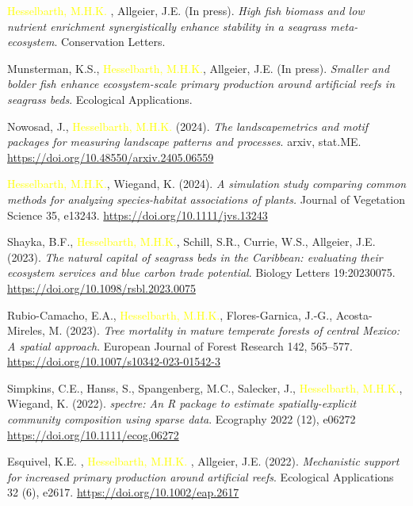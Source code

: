 \documentclass[hidelinks]{report}
\begin{document}
\begin{hangparas}{7.5mm}{1}
	
\textcolor{yellow}{Hesselbarth, M.H.K.} \textcolor{green}{\Cross}, Allgeier, J.E. \textcolor{green}{\Cross} (In press). \textit{High fish biomass and low nutrient enrichment synergistically enhance stability in a seagrass meta-ecosystem}. Conservation Letters.	

Munsterman, K.S., \textcolor{yellow}{Hesselbarth, M.H.K.}, Allgeier, J.E. (In press). \textit{Smaller and bolder fish enhance ecosystem-scale primary production around artificial reefs in seagrass beds}. Ecological Applications. %
		
Nowosad, J., \textcolor{yellow}{Hesselbarth, M.H.K.} (2024). \textit{The landscapemetrics and motif packages for measuring landscape patterns and processes}. arxiv, stat.ME. \url{https://doi.org/10.48550/arxiv.2405.06559}

\textcolor{yellow}{Hesselbarth, M.H.K.}, Wiegand, K. (2024). \textit{A simulation study comparing common methods for analyzing species-habitat associations of plants.} Journal of Vegetation Science 35, e13243. \url{https://doi.org/10.1111/jvs.13243}
	
Shayka, B.F., \textcolor{yellow}{Hesselbarth, M.H.K.}, Schill, S.R., Currie, W.S., Allgeier, J.E. (2023). \textit{The natural capital of seagrass beds in the Caribbean: evaluating their ecosystem services and blue carbon trade potential}. Biology Letters 19:20230075. \url{https://doi.org/10.1098/rsbl.2023.0075}
	
Rubio-Camacho, E.A., \textcolor{yellow}{Hesselbarth, M.H.K.}, Flores-Garnica, J.-G., Acosta-Mireles, M. (2023). \textit{Tree mortality in mature temperate forests of central Mexico: A spatial approach}. European Journal of Forest Research 142, 565–577. \url{https://doi.org/10.1007/s10342-023-01542-3}

Simpkins, C.E., Hanss, S., Spangenberg, M.C., Salecker, J., \textcolor{yellow}{Hesselbarth, M.H.K.}, Wiegand, K. (2022). \textit{spectre: An R package to estimate spatially-explicit community composition using sparse data}. Ecography 2022 (12), e06272 \url{https://doi.org/10.1111/ecog.06272}

Esquivel, K.E. \textcolor{green}{\Cross}, \textcolor{yellow}{Hesselbarth, M.H.K.} \textcolor{green}{\Cross}, Allgeier, J.E. (2022). \textit{Mechanistic support for increased primary production around artificial reefs}. Ecological Applications 32 (6), e2617. \url{https://doi.org/10.1002/eap.2617}


\end{hangparas}
\end{document}
